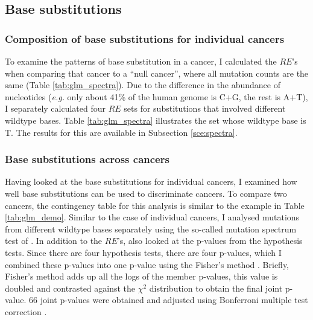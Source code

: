\subsection{Base substitutions}\label{methods:spectra}
\subsubsection{Composition of base substitutions for individual cancers}
To examine the patterns of base substitution in a cancer, I calculated the $RE$'s when comparing that cancer to a ``null cancer'', where all mutation counts are the same (Table \ref{tab:glm_spectra}). Due to the difference in the abundance of nucleotides (\textit{e.g.} only about 41\% of the human genome is C+G, the rest is A+T), I separately calculated four $RE$ sets for substitutions that involved different wildtype bases. Table \ref{tab:glm_spectra} illustrates the set whose wildtype base is T. The results for this are available in Subsection \ref{sce:spectra}.



\subsubsection{Base substitutions across cancers}
Having looked at the base substitutions for individual cancers, I examined how well base substitutions can be used to discriminate cancers. To compare two cancers, the contingency table for this analysis is similar to the example in Table \ref{tab:glm_demo}. Similar to the case of individual cancers, I analysed mutations from different wildtype bases separately using the so-called mutation spectrum test of \citet{Zhu2017}. In addition to the $RE$'s, also looked at the p-values from the hypothesis tests. Since there are four hypothesis tests, there are four p-values, which I combined these p-values into one p-value using the Fisher's method \citep[details in \ref{apdx:fisher};][]{Fisher1992StatisticalWorkers}. Briefly, Fisher's method adds up all the logs of the member p-values, this value is doubled and contrasted against the $\chi^2$ distribution to obtain the final joint p-value. 66 joint p-values were obtained and adjusted using Bonferroni multiple test correction \citep[equation \ref{eq:bonferroni};][]{Armstrong2014WhenCorrection}.

